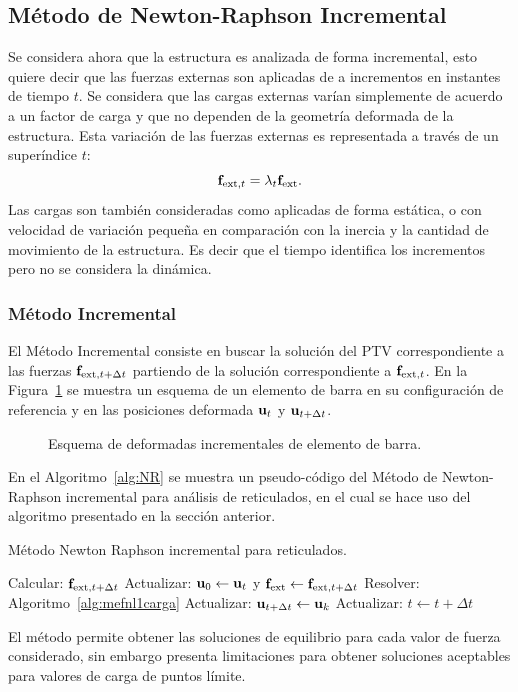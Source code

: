 \subsection{Método de Newton-Raphson Incremental}

Se considera ahora que la estructura es analizada de forma incremental, esto quiere decir que las fuerzas externas son aplicadas de a incrementos en instantes de tiempo $t$. Se considera que las cargas externas varían simplemente de acuerdo a un factor de carga y que no dependen de la geometría deformada de la estructura. %
%
Esta variación de las fuerzas externas es representada a través de un superíndice $t$: 
%
\begin{equation}
{\bf f}_{\text{ext},t} = \lambda_t {\bf f}_{\text{ext}}.
\end{equation}
%
Las cargas son también consideradas como aplicadas de forma estática, o con velocidad de variación pequeña en comparación con la inercia y la cantidad de movimiento de la estructura. %
Es decir que el tiempo identifica los incrementos pero no se considera la dinámica.



\subsubsection{Método Incremental}

El Método Incremental consiste en buscar la solución del PTV correspondiente a las fuerzas ${\bf f}_{\text{ext},t+\Delta t}$ partiendo de la solución correspondiente a ${\bf f}_{\text{ext},t}$. %
%
En la Figura~\ref{fig:esquema_barra_ptv} se muestra un esquema de un elemento de barra en su configuración de referencia y en las posiciones deformada ${\bf u}_t$ y ${\bf u}_{t+\Delta t}$.

\begin{figure}[htb]
	\centering
\def\svgwidth{0.65\textwidth}
%
	\caption{Esquema de deformadas incrementales de elemento de barra.}
	\label{fig:esquema_barra_ptv}
\end{figure}

En el Algoritmo~\ref{alg:NR} se muestra un pseudo-código del Método de Newton-Raphson incremental para análisis de reticulados, en el cual se hace uso del algoritmo presentado en la sección anterior. %
%
\begin{algorithm}[htb]	
	\caption{Método Newton Raphson incremental para reticulados.}
	\label{alg:NR}
	\begin{algorithmic}[1]
		\STATE Calcular: ${\bf f}_{\text{ext},t+\Delta t}$
		\STATE Actualizar: ${\bf u}_0 \leftarrow {\bf u}_t$ y ${\bf f}_{\text{ext}} \leftarrow {\bf f}_{\text{ext},t+\Delta t}$
		\STATE Resolver: Algoritmo~\ref{alg:mefnl1carga} 
		\STATE Actualizar: ${\bf u}_{t+\Delta t} \leftarrow {\bf u}_k$
		\STATE Actualizar: $t \leftarrow t+\Delta t$
		\ENDWHILE		
	\end{algorithmic}
\end{algorithm}
%
El método permite obtener las soluciones de equilibrio para cada valor de fuerza considerado, sin embargo presenta limitaciones para obtener soluciones aceptables para valores de carga de puntos límite. %

